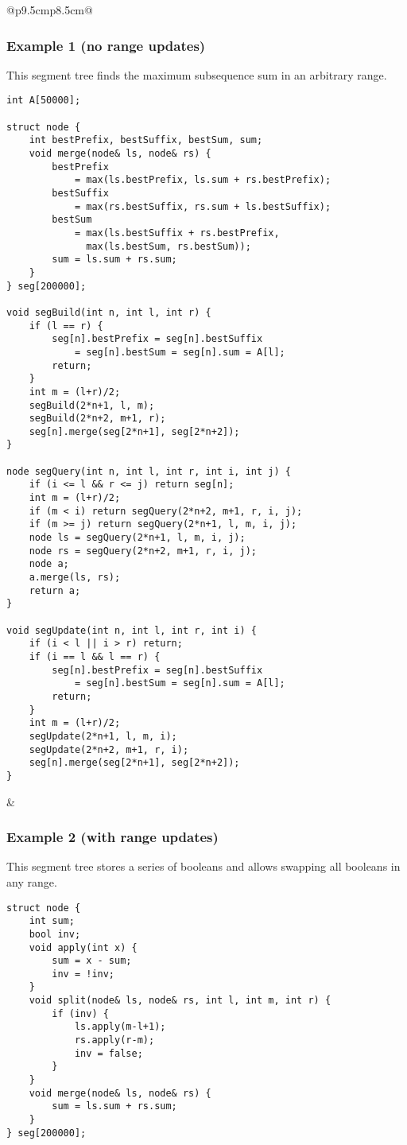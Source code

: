 \documentclass[letterpaper]{article}
\begin{document}
\begin{tabular}{@{}p{9.5cm}p{8.5cm}@{}}
    \subsubsection{Example 1 (no range updates)}
    This segment tree finds the maximum subsequence sum in an arbitrary range.

    \begin{lstlisting}
int A[50000];

struct node {
	int bestPrefix, bestSuffix, bestSum, sum;
	void merge(node& ls, node& rs) {
		bestPrefix
			= max(ls.bestPrefix, ls.sum + rs.bestPrefix);
		bestSuffix
			= max(rs.bestSuffix, rs.sum + ls.bestSuffix);
		bestSum
			= max(ls.bestSuffix + rs.bestPrefix,
			  max(ls.bestSum, rs.bestSum));
		sum = ls.sum + rs.sum;
	}
} seg[200000];

void segBuild(int n, int l, int r) {
	if (l == r) {
		seg[n].bestPrefix = seg[n].bestSuffix
			= seg[n].bestSum = seg[n].sum = A[l];
		return;
	}
	int m = (l+r)/2;
	segBuild(2*n+1, l, m);
	segBuild(2*n+2, m+1, r);
	seg[n].merge(seg[2*n+1], seg[2*n+2]);
}

node segQuery(int n, int l, int r, int i, int j) {
	if (i <= l && r <= j) return seg[n];
	int m = (l+r)/2;
	if (m < i) return segQuery(2*n+2, m+1, r, i, j);
	if (m >= j) return segQuery(2*n+1, l, m, i, j);
	node ls = segQuery(2*n+1, l, m, i, j);
	node rs = segQuery(2*n+2, m+1, r, i, j);
	node a;
	a.merge(ls, rs);
	return a;
}

void segUpdate(int n, int l, int r, int i) {
	if (i < l || i > r) return;
	if (i == l && l == r) {
		seg[n].bestPrefix = seg[n].bestSuffix
			= seg[n].bestSum = seg[n].sum = A[l];
		return;
	}
	int m = (l+r)/2;
	segUpdate(2*n+1, l, m, i);
	segUpdate(2*n+2, m+1, r, i);
	seg[n].merge(seg[2*n+1], seg[2*n+2]);
}
\end{lstlisting}
     &
    \subsubsection{Example 2 (with range updates)}

    This segment tree stores a series of booleans and allows swapping all booleans in any range.

    \begin{lstlisting}
struct node {
	int sum;
	bool inv;
	void apply(int x) {
		sum = x - sum;
		inv = !inv;
	}
	void split(node& ls, node& rs, int l, int m, int r) {
		if (inv) {
			ls.apply(m-l+1);
			rs.apply(r-m);
			inv = false;
		}
	}
	void merge(node& ls, node& rs) {
		sum = ls.sum + rs.sum;
	}
} seg[200000];


\end{lstlisting}
\end{tabular}
\end{document}
